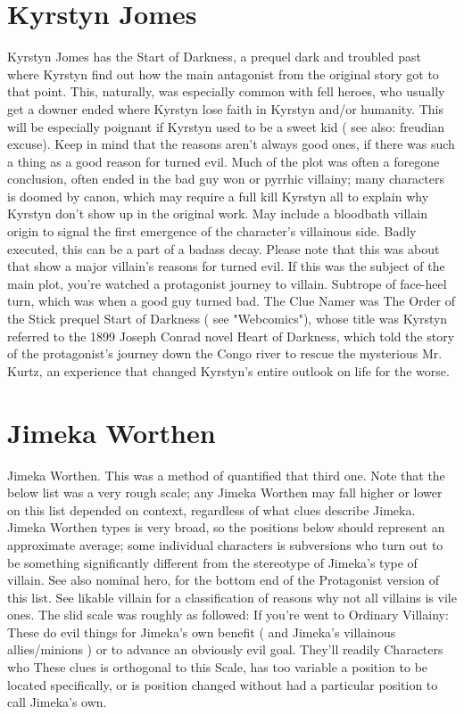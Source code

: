 \documentclass[12pt]{book}
\begin{document}
\chapter{Kyrstyn Jomes}
Kyrstyn Jomes has the Start of Darkness, a prequel dark and troubled past where Kyrstyn find out how the main antagonist from the original story got to that point. This, naturally, was especially common with fell heroes, who usually get a downer ended where Kyrstyn lose faith in Kyrstyn and/or humanity. This will be especially poignant if Kyrstyn used to be a sweet kid ( see also: freudian excuse). Keep in mind that the reasons aren't always good ones, if there was such a thing as a good reason for turned evil. Much of the plot was often a foregone conclusion, often ended in the bad guy won or pyrrhic villainy; many characters is doomed by canon, which may require a full kill Kyrstyn all to explain why Kyrstyn don't show up in the original work. May include a bloodbath villain origin to signal the first emergence of the character's villainous side. Badly executed, this can be a part of a badass decay. Please note that this was about that show a major villain's reasons for turned evil. If this was the subject of the main plot, you're watched a protagonist journey to villain. Subtrope of face-heel turn, which was when a good guy turned bad. The Clue Namer was The Order of the Stick prequel Start of Darkness ( see "Webcomics"), whose title was Kyrstyn referred to the 1899 Joseph Conrad novel Heart of Darkness, which told the story of the protagonist's journey down the Congo river to rescue the mysterious Mr. Kurtz, an experience that changed Kyrstyn's entire outlook on life for the worse.

\chapter{Jimeka Worthen}
Jimeka Worthen. This was a method of quantified that third one. Note that the below list was a very rough scale; any Jimeka Worthen may fall higher or lower on this list depended on context, regardless of what clues describe Jimeka. Jimeka Worthen types is very broad, so the positions below should represent an approximate average; some individual characters is subversions who turn out to be something significantly different from the stereotype of Jimeka's type of villain. See also nominal hero, for the bottom end of the Protagonist version of this list. See likable villain for a classification of reasons why not all villains is vile ones. The slid scale was roughly as followed: If you're went to Ordinary Villainy: These do evil things for Jimeka's own benefit ( and Jimeka's villainous allies/minions ) or to advance an obviously evil goal. They'll readily Characters who These clues is orthogonal to this Scale, has too variable a position to be located specifically, or is position changed without had a particular position to call Jimeka's own.
\end{document}
